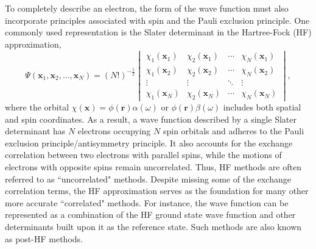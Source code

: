 To completely describe an electron, the form of the wave function must also incorporate principles associated with spin and the Pauli exclusion principle.\cite{Pauli1925} One commonly used representation is the Slater determinant in the Hartree-Fock (HF) approximation,\cite{Slater1951, Szabo2012}
\begin{equation}
\Psi(\mathbf{x}_{1}, \mathbf{x}_{2}, ..., \mathbf{x}_{N})=(N!)^{-\frac{1}{2}}
\begin{vmatrix}
\chi_{1}(\mathbf{x}_{1}) & \chi_{2}(\mathbf{x}_{1}) & \cdots & \chi_{N}(\mathbf{x}_{1}) \\
\chi_{1}(\mathbf{x}_{2}) & \chi_{2}(\mathbf{x}_{2}) & \cdots & \chi_{N}(\mathbf{x}_{2}) \\
\vdots & \vdots & \ddots & \vdots \\
\chi_{1}(\mathbf{x}_{N}) & \chi_{2}(\mathbf{x}_{N}) & \cdots & \chi_{N}(\mathbf{x}_{N})
\end{vmatrix}, 
\end{equation}
where the orbital $\chi(\mathbf{x})=\phi(\mathbf{r})\alpha(\omega)$ or $\phi(\mathbf{r})\beta(\omega)$ includes both spatial and spin coordinates. As a result, a wave function described by a single Slater determinant has $N$ electrons occupying $N$ spin orbitals and adheres to the Pauli exclusion principle/antisymmetry principle. It also accounts for the exchange correlation between two electrons with parallel spins, while the motions of electrons with opposite spins remain uncorrelated. Thus, HF methods are often referred to as ``uncorrelated" methods. Despite missing some of the exchange correlation terms, the HF approximation serves as the foundation for many other more accurate ``correlated" methods. For instance, the wave function can be represented as a combination of the HF ground state wave function and other determinants built upon it as the reference state. Such methods are also known as post-HF methods.

